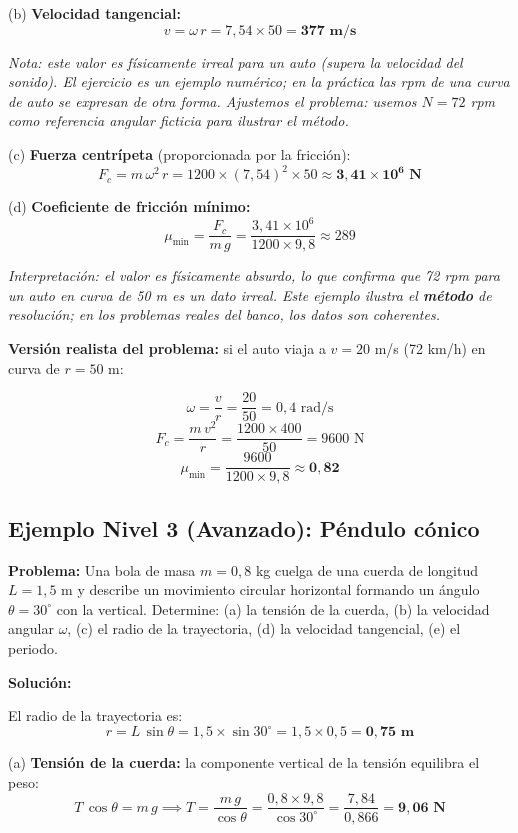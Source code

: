 \documentclass[12pt]{article}
\begin{document}
(b) \textbf{Velocidad tangencial:}
\[
v = \omega\,r = 7{,}54 \times 50 = \mathbf{377 \text{ m/s}}
\]

\textit{Nota: este valor es físicamente irreal para un auto (supera la velocidad del sonido). El ejercicio es un ejemplo numérico; en la práctica las rpm de una curva de auto se expresan de otra forma. Ajustemos el problema: usemos \(N = 72\) rpm como referencia angular ficticia para ilustrar el método.}

(c) \textbf{Fuerza centrípeta} (proporcionada por la fricción):
\[
F_c = m\,\omega^2\,r = 1200 \times (7{,}54)^2 \times 50 \approx \mathbf{3{,}41 \times 10^6 \text{ N}}
\]

(d) \textbf{Coeficiente de fricción mínimo:}
\[
\mu_{\min} = \frac{F_c}{m\,g} = \frac{3{,}41 \times 10^6}{1200 \times 9{,}8} \approx 289
\]

\textit{Interpretación: el valor es físicamente absurdo, lo que confirma que 72 rpm para un auto en curva de 50 m es un dato irreal. Este ejemplo ilustra el \textbf{método} de resolución; en los problemas reales del banco, los datos son coherentes.}

\textbf{Versión realista del problema:} si el auto viaja a \(v = 20\) m/s (72 km/h) en curva de \(r = 50\) m:

\[
\omega = \frac{v}{r} = \frac{20}{50} = 0{,}4 \text{ rad/s}
\]
\[
F_c = \frac{m\,v^2}{r} = \frac{1200 \times 400}{50} = 9600 \text{ N}
\]
\[
\mu_{\min} = \frac{9600}{1200 \times 9{,}8} \approx \mathbf{0{,}82}
\]

\subsection*{Ejemplo Nivel 3 (Avanzado): Péndulo cónico}

\textbf{Problema:} Una bola de masa \(m = 0{,}8\) kg cuelga de una cuerda de longitud \(L = 1{,}5\) m y describe un movimiento circular horizontal formando un ángulo \(\theta = 30^\circ\) con la vertical. Determine: (a) la tensión de la cuerda, (b) la velocidad angular \(\omega\), (c) el radio de la trayectoria, (d) la velocidad tangencial, (e) el periodo.

\textbf{Solución:}

El radio de la trayectoria es:
\[
r = L\,\sin\theta = 1{,}5 \times \sin 30^\circ = 1{,}5 \times 0{,}5 = \mathbf{0{,}75 \text{ m}}
\]

(a) \textbf{Tensión de la cuerda:} la componente vertical de la tensión equilibra el peso:
\[
T\,\cos\theta = m\,g \implies T = \frac{m\,g}{\cos\theta} = \frac{0{,}8 \times 9{,}8}{\cos 30^\circ} = \frac{7{,}84}{0{,}866} = \mathbf{9{,}06 \text{ N}}
\]
\end{document}

